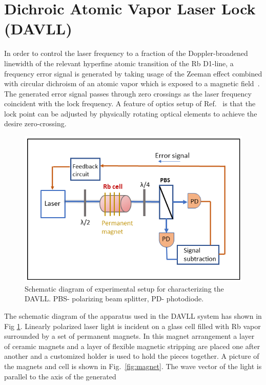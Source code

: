 \section{Dichroic Atomic Vapor Laser Lock (DAVLL)\label{sec:DAVLL}}

In order to control the laser frequency to a fraction of the
Doppler-broadened linewidth of the relevant hyperfine atomic
transition of the Rb D1-line, a frequency error signal is generated by
taking usage of the Zeeman effect combined with circular dichroism of
an atomic vapor which is exposed to a magnetic
field~\cite{doi:10.1063/1.3568824}. The generated error signal passes
through zero crossings as the laser frequency coincident with the lock
frequency.  A feature of optics setup of
Ref.~\cite{doi:10.1063/1.3568824} is that the lock point can be
adjusted by physically rotating optical elements to achieve the desire
zero-crossing.
\begin{figure}%
\centering
\includegraphics[width=0.8\linewidth]{figures/DAVLL}
\caption{Schematic diagram of experimental setup for characterizing the DAVLL. PBS- polarizing beam splitter, PD- photodiode.\label{fig:DAVLL}}
\end{figure}
The schematic diagram of the apparatus used in the DAVLL system has
shown in Fig \ref{fig:DAVLL}. Linearly polarized laser light is
incident on a glass cell filled with Rb vapor surrounded by a set of
permanent magnets. In this magnet arrangement a layer of ceramic
magnets and a layer of flexible magnetic stripping are placed one
after another and a customized holder is used to hold the pieces
together.  A picture of the magnets and cell is shown in
Fig.~\ref{fig:magnet}.
The wave vector of the light is parallel to the axis of the generated
